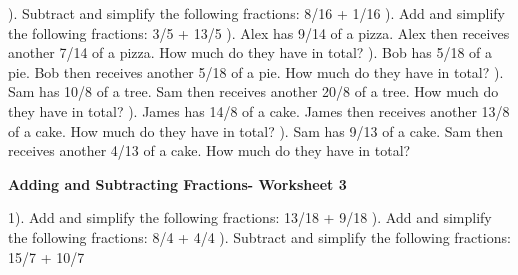 \documentclass{article}%
\begin{document}
\newline%
\newline%
). Subtract and simplify the following fractions: 8/16 + 1/16%
\newline%
\newline%
). Add and simplify the following fractions: 3/5 + 13/5%
\newline%
\newline%
). Alex has 9/14 of a pizza. Alex then receives another 7/14 of a pizza. How much do they have in total?%
\newline%
\newline%
). Bob has 5/18 of a pie. Bob then receives another 5/18 of a pie. How much do they have in total?%
\newline%
\newline%
). Sam has 10/8 of a tree. Sam then receives another 20/8 of a tree. How much do they have in total?%
\newline%
\newline%
). James has 14/8 of a cake. James then receives another 13/8 of a cake. How much do they have in total?%
\newline%
\newline%
). Sam has 9/13 of a cake. Sam then receives another 4/13 of a cake. How much do they have in total?%
\newline%
\newline%
\newline%
\pagebreak%
\large%
\begin{center}%
\textbf{Adding and Subtracting Fractions- Worksheet 3}%
\newline%
\end{center} \normalsize%
1). Add and simplify the following fractions: 13/18 + 9/18%
\newline%
\newline%
). Add and simplify the following fractions: 8/4 + 4/4%
\newline%
\newline%
). Subtract and simplify the following fractions: 15/7 + 10/7%
\newline%
\end{document}
